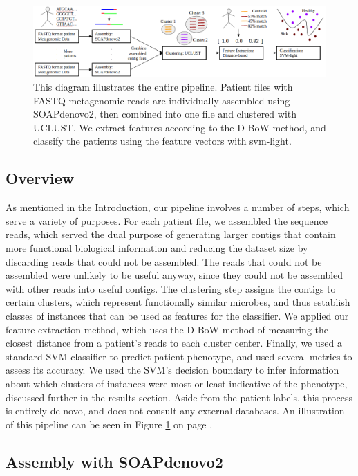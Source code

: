 
\begin{figure}[t]
\centering
\includegraphics[scale=0.5]{./mil-metagenomics-pipeline.png}
\caption{This diagram illustrates the entire pipeline. Patient files with FASTQ metagenomic reads are individually assembled using SOAPdenovo2, then combined into one file and clustered with UCLUST. We extract features according to the D-BoW method, and classify the patients using the feature vectors with svm-light.} \label{pipeline}
\end{figure}

\subsection{Overview}

As mentioned in the Introduction, our pipeline involves a number of steps, which serve a variety of purposes. For each patient file, we assembled the sequence reads, which served the dual purpose of generating larger contigs that contain more functional biological information and reducing the dataset size by discarding reads that could not be assembled. The reads that could not be assembled were unlikely to be useful anyway, since they could not be assembled with other reads into useful contigs. The clustering step assigns the contigs to certain clusters, which represent functionally similar microbes, and thus establish classes of instances that can be used as features for the classifier. We  applied our feature extraction method, which uses the D-BoW method of measuring the closest distance from a patient's reads to each cluster center. Finally, we used a standard SVM classifier to predict patient phenotype, and used several metrics to assess its accuracy. We used the SVM's decision boundary to infer information about which clusters of instances were most or least indicative of the phenotype, discussed further in the results section. Aside from the patient labels, this process is entirely de novo, and does not consult any external databases. An illustration of this pipeline can be seen in Figure \ref{pipeline} on page \pageref{pipeline}.

\subsection{Assembly with SOAPdenovo2}

